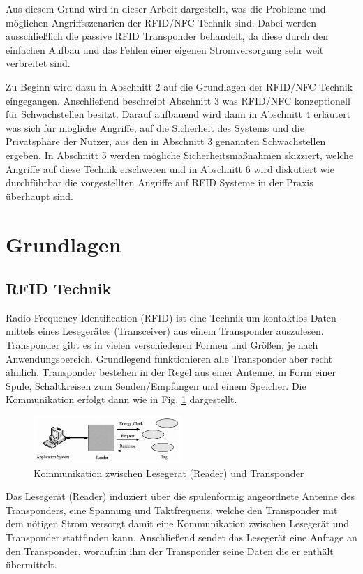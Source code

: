 \documentclass[conference]{IEEEtran}
\begin{document}
Aus diesem Grund wird in dieser Arbeit dargestellt, was die Probleme und möglichen Angriffsszenarien der RFID/NFC Technik sind. Dabei werden ausschließlich die passive RFID Transponder behandelt, da diese durch den einfachen Aufbau und das Fehlen einer eigenen Stromversorgung sehr weit verbreitet sind.

Zu Beginn wird dazu in Abschnitt 2 auf die Grundlagen der RFID/NFC Technik eingegangen. Anschließend beschreibt Abschnitt 3 was RFID/NFC konzeptionell für Schwachstellen besitzt. Darauf aufbauend wird dann in Abschnitt 4 erläutert was sich für mögliche Angriffe, auf die Sicherheit des Systems und die Privatsphäre der Nutzer, aus den in Abschnitt 3 genannten Schwachstellen ergeben. In Abschnitt 5 werden mögliche Sicherheitsmaßnahmen skizziert, welche Angriffe auf diese Technik erschweren und in Abschnitt 6 wird diskutiert wie durchführbar die vorgestellten Angriffe auf RFID Systeme in der Praxis überhaupt sind.


\section{Grundlagen}

\subsection{RFID Technik}
Radio Frequency Identification (RFID) ist eine Technik um kontaktlos Daten mittels eines Lesegerätes (Transceiver) aus einem Transponder auszulesen. Transponder gibt es in vielen verschiedenen Formen und Größen, je nach Anwendungsbereich. Grundlegend funktionieren alle Transponder aber recht ähnlich. Transponder bestehen in der Regel aus einer Antenne, in Form einer Spule, Schaltkreisen zum Senden/Empfangen und einem Speicher. Die Kommunikation erfolgt dann wie in Fig. \ref{fig1} dargestellt.

\begin{figure}[htbp]
\centerline{\includegraphics[width=0.5\textwidth]{img/kommunikation.png}}
\caption{Kommunikation zwischen Lesegerät (Reader) und Transponder \cite{b1}}
\label{fig1}
\end{figure}

Das Lesegerät (Reader) induziert über die spulenförmig angeordnete Antenne des Transponders, eine Spannung und Taktfrequenz, welche den Transponder mit dem nötigen Strom versorgt damit eine Kommunikation zwischen Lesegerät und Transponder stattfinden kann. Anschließend sendet das Lesegerät eine Anfrage an den Transponder, woraufhin ihm der Transponder seine Daten die er enthält übermittelt.
\end{document}
